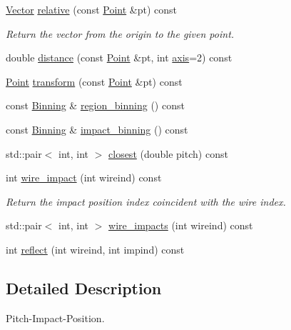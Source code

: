 \begin{DoxyCompactItemize}
\item 
\hyperlink{namespace_wire_cell_aa3c82d3ba85f032b0d278b7004846800}{Vector} \hyperlink{class_wire_cell_1_1_pimpos_a291dda9270d9feb2a0f8afa18e4cf9e2}{relative} (const \hyperlink{namespace_wire_cell_ab2b2565fa6432efbb4513c14c988cda9}{Point} \&pt) const
\begin{DoxyCompactList}\small\item\em Return the vector from the origin to the given point. \end{DoxyCompactList}\item 
double \hyperlink{class_wire_cell_1_1_pimpos_abeadf8b503815d0dbfaf5d94d245b5bd}{distance} (const \hyperlink{namespace_wire_cell_ab2b2565fa6432efbb4513c14c988cda9}{Point} \&pt, int \hyperlink{class_wire_cell_1_1_pimpos_a0eed2ce13249e92b343e94e0ecaa3953}{axis}=2) const
\item 
\hyperlink{namespace_wire_cell_ab2b2565fa6432efbb4513c14c988cda9}{Point} \hyperlink{class_wire_cell_1_1_pimpos_a0d2db56d6956aee06d0218ee50400f25}{transform} (const \hyperlink{namespace_wire_cell_ab2b2565fa6432efbb4513c14c988cda9}{Point} \&pt) const
\item 
const \hyperlink{class_wire_cell_1_1_binning}{Binning} \& \hyperlink{class_wire_cell_1_1_pimpos_ac2d0a4ce2474237948537f0e4bd358f5}{region\+\_\+binning} () const
\item 
const \hyperlink{class_wire_cell_1_1_binning}{Binning} \& \hyperlink{class_wire_cell_1_1_pimpos_a1b8aef1ec7d1cf9eb9d5d78a6359e2aa}{impact\+\_\+binning} () const
\item 
std\+::pair$<$ int, int $>$ \hyperlink{class_wire_cell_1_1_pimpos_ae3a8be480718c7cf1ad0551947591fc3}{closest} (double pitch) const
\item 
int \hyperlink{class_wire_cell_1_1_pimpos_ae91d0c7565196dba1fbf9bd83760d25e}{wire\+\_\+impact} (int wireind) const
\begin{DoxyCompactList}\small\item\em Return the impact position index coincident with the wire index. \end{DoxyCompactList}\item 
std\+::pair$<$ int, int $>$ \hyperlink{class_wire_cell_1_1_pimpos_a185f13fbfd5be1350fe5ba268f7557ca}{wire\+\_\+impacts} (int wireind) const
\item 
int \hyperlink{class_wire_cell_1_1_pimpos_a712e8a7789b061dd96f1e21f15ecdc42}{reflect} (int wireind, int impind) const
\end{DoxyCompactItemize}


\subsection{Detailed Description}
Pitch-\/\+Impact-\/\+Position. 


